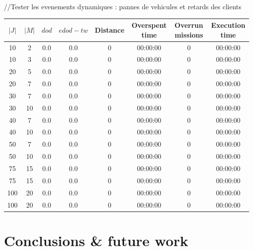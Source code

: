 \documentclass[a4paper,10pt]{article}
\begin{document}
//Tester les evenements dynamiques : pannes de vehicules et retards des clients

\begin{center}
  \begin{tabular}{|c|c|c|c|c|c|c|c|} 
\hline
{\bf $|J|$} & {\bf $|M|$} & {\bf $dod$} & {\bf $edod-tw$} & {\bf Distance} & {\bf Overspent time} & {\bf Overrun missions} &  {\bf Execution time} \\ \hline
10	 & 2 	& 0.0	& 0.0	& 0	& 00:00:00	& 0	& 00:00:00\\
10	 & 3 	& 0.0	& 0.0	& 0	& 00:00:00	& 0	& 00:00:00\\
20	 & 5 	& 0.0	& 0.0	& 0	& 00:00:00	& 0	& 00:00:00\\
20	 & 7 	& 0.0	& 0.0	& 0	& 00:00:00	& 0	& 00:00:00\\
30	 & 7 	& 0.0	& 0.0	& 0	& 00:00:00	& 0	& 00:00:00\\
30	 & 10 	& 0.0	& 0.0	& 0	& 00:00:00	& 0	& 00:00:00\\
40	 & 7 	& 0.0	& 0.0	& 0	& 00:00:00	& 0	& 00:00:00\\
40	 & 10 	& 0.0	& 0.0	& 0	& 00:00:00	& 0	& 00:00:00\\
50	 & 7 	& 0.0	& 0.0	& 0	& 00:00:00	& 0	& 00:00:00\\
50	 & 10 	& 0.0	& 0.0	& 0	& 00:00:00	& 0	& 00:00:00\\
75	 & 15 	& 0.0	& 0.0	& 0	& 00:00:00	& 0	& 00:00:00\\
75	 & 15 	& 0.0	& 0.0	& 0	& 00:00:00	& 0	& 00:00:00\\
100	 & 20 	& 0.0	& 0.0	& 0	& 00:00:00	& 0	& 00:00:00\\
100	 & 20 	& 0.0	& 0.0	& 0	& 00:00:00	& 0	& 00:00:00\\
\hline
\end{tabular}
\end{center}

\section{Conclusions \& future work}



\end{document}
